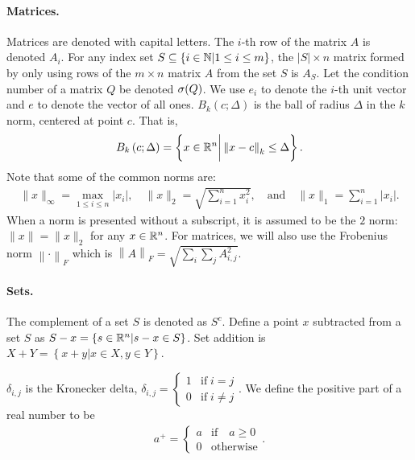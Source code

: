 \documentclass{article}
\begin{document}
\paragraph*{Matrices.}
Matrices are denoted with capital letters.
The $i$-th row of the matrix $A$ is denoted $A_i$.
For any index set $S \subseteq \{i \in \mathbb N | 1 \le i \le m\}$, the $|S| \times n$ matrix formed by only using
rows of the $m\times n$ matrix $A$ from the set $S$ is $A_S$.
Let the condition number of a matrix $Q$ be denoted ${\sigma}(Q)$.
We use $e_i$ to denote the $i$-th unit vector and $e$ to denote the vector of all ones.
$B_k\left(c; \Delta\right)$ is the ball of radius $\Delta$ in the $k$ norm, centered at point $c$.  That is,
\begin{align}
\label{define_ball}
B_k\left(c; \Delta\right) = \left\{x \in \mathbb R^n \bigg | \left\|x - c\right\|_k \le \Delta \right\}.
\end{align}
Note that some of the common norms are:
\begin{align*}
\|x\|_{\infty} = \max_{1\le i\le n}|x_i|, \quad
\|x\|_{2} = \sqrt{\sum_{i=1}^n x_i^2}, \quad \textrm{and} \quad
\|x\|_1 = \sum_{i = 1}^n |x_i|.
\end{align*}
When a norm is presented without a subscript, it is assumed to be the $2$ norm: $\|x\| = \|x\|_2$ for any $x \in \mathbb R^n$.
For matrices, we will also use the Frobenius norm $\left\|\cdot\right\|_F$ which is $\left\|A\right\|_F = \sqrt{\sum_i\sum_jA_{i, j}^2}$.

\paragraph*{Sets.}
The complement of a set $S$ is denoted as $S^c$.
Define a point $x$ subtracted from a set $S$ as $S - x = \left\{s \in \mathbb R^n | s - x \in S\right\}$.
Set addition is $X + Y = \left\{x + y | x \in X, y \in Y\right\}$.

$\delta_{i,j}$ is the Kronecker delta, $\delta_{i, j} = \begin{cases} 1 & \textrm{if} \; i = j \\ 0 & \textrm{if} \; i \ne j \end{cases}$.
We define the positive part of a real number to be
\begin{align*}
a^+ = \begin{cases} a & \textrm{if} \quad a \ge 0 \\ 0 & \textrm{otherwise} \end{cases}.\\
\end{align*}
\end{document}
